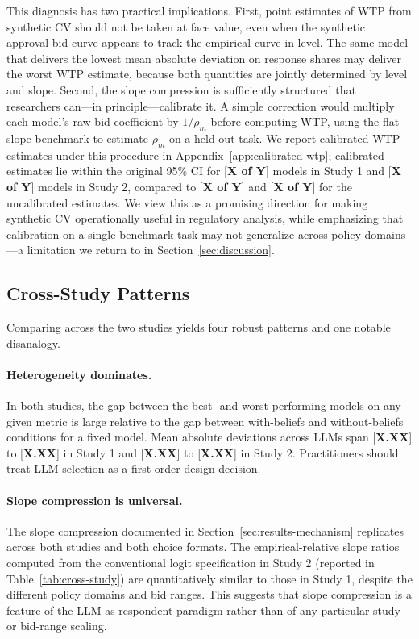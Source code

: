 \documentclass[12pt]{article}
\begin{document}
This diagnosis has two practical implications. First, point estimates of WTP from synthetic CV should not be taken at face value, even when the synthetic approval-bid curve appears to track the empirical curve in level. The same model that delivers the lowest mean absolute deviation on response shares may deliver the worst WTP estimate, because both quantities are jointly determined by level and slope. Second, the slope compression is sufficiently structured that researchers can---in principle---calibrate it. A simple correction would multiply each model's raw bid coefficient by $1/\rho_m$ before computing WTP, using the flat-slope benchmark to estimate $\rho_m$ on a held-out task. We report calibrated WTP estimates under this procedure in Appendix~\ref{app:calibrated-wtp}; calibrated estimates lie within the original 95\% CI for [\textbf{X of Y}] models in Study 1 and [\textbf{X of Y}] models in Study 2, compared to [\textbf{X of Y}] and [\textbf{X of Y}] for the uncalibrated estimates. We view this as a promising direction for making synthetic CV operationally useful in regulatory analysis, while emphasizing that calibration on a single benchmark task may not generalize across policy domains---a limitation we return to in Section~\ref{sec:discussion}.

\subsection{Cross-Study Patterns}\label{sec:results-cross}

Comparing across the two studies yields four robust patterns and one notable disanalogy.

\paragraph{Heterogeneity dominates.} In both studies, the gap between the best- and worst-performing models on any given metric is large relative to the gap between with-beliefs and without-beliefs conditions for a fixed model. Mean absolute deviations across LLMs span [\textbf{X.XX}] to [\textbf{X.XX}] in Study 1 and [\textbf{X.XX}] to [\textbf{X.XX}] in Study 2. Practitioners should treat LLM selection as a first-order design decision.

\paragraph{Slope compression is universal.} The slope compression documented in Section~\ref{sec:results-mechanism} replicates across both studies and both choice formats. The empirical-relative slope ratios computed from the conventional logit specification in Study 2 (reported in Table~\ref{tab:cross-study}) are quantitatively similar to those in Study 1, despite the different policy domains and bid ranges. This suggests that slope compression is a feature of the LLM-as-respondent paradigm rather than of any particular study or bid-range scaling.
\end{document}
